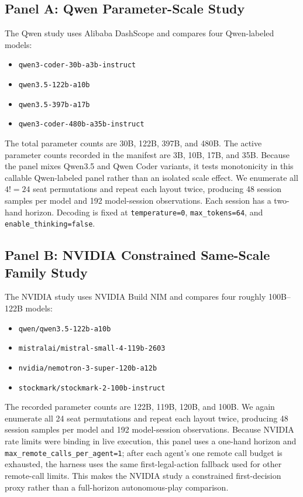 \documentclass[11pt]{article}
\begin{document}
\subsection{Panel A: Qwen Parameter-Scale Study}
The Qwen study uses Alibaba DashScope and compares four Qwen-labeled models:
\begin{itemize}
    \item \texttt{qwen3-coder-30b-a3b-instruct}
    \item \texttt{qwen3.5-122b-a10b}
    \item \texttt{qwen3.5-397b-a17b}
    \item \texttt{qwen3-coder-480b-a35b-instruct}
\end{itemize}
The total parameter counts are 30B, 122B, 397B, and 480B. The active parameter counts recorded in the manifest are 3B, 10B, 17B, and 35B. Because the panel mixes Qwen3.5 and Qwen Coder variants, it tests monotonicity in this callable Qwen-labeled panel rather than an isolated scale effect. We enumerate all $4! = 24$ seat permutations and repeat each layout twice, producing 48 session samples per model and 192 model-session observations. Each session has a two-hand horizon. Decoding is fixed at \texttt{temperature=0}, \texttt{max\_tokens=64}, and \texttt{enable\_thinking=false}.

\subsection{Panel B: NVIDIA Constrained Same-Scale Family Study}
The NVIDIA study uses NVIDIA Build NIM and compares four roughly 100B--122B models:
\begin{itemize}
    \item \texttt{qwen/qwen3.5-122b-a10b}
    \item \texttt{mistralai/mistral-small-4-119b-2603}
    \item \texttt{nvidia/nemotron-3-super-120b-a12b}
    \item \texttt{stockmark/stockmark-2-100b-instruct}
\end{itemize}
The recorded parameter counts are 122B, 119B, 120B, and 100B. We again enumerate all 24 seat permutations and repeat each layout twice, producing 48 session samples per model and 192 model-session observations. Because NVIDIA rate limits were binding in live execution, this panel uses a one-hand horizon and \texttt{max\_remote\_calls\_per\_agent=1}; after each agent's one remote call budget is exhausted, the harness uses the same first-legal-action fallback used for other remote-call limits. This makes the NVIDIA study a constrained first-decision proxy rather than a full-horizon autonomous-play comparison.
\end{document}
